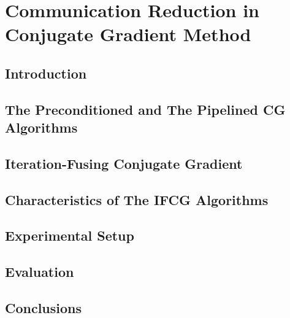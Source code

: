 \chapter{Communication Reduction in Conjugate Gradient Method}
\label{chap:ifcg}

\newcommand{\MAXPERF}{42\%}
\newcommand{\AVERAGEPERF}{13\%}
\newcommand{\MAXLOC}{81\%}
\newcommand{\AVERAGELOC}{28\%}

\section{Introduction}

\section{The Preconditioned and The Pipelined CG Algorithms}
\label{sec:ifcg_existingCG}

\section{Iteration-Fusing Conjugate Gradient}
\label{sec:ifcg_ifcg}

\section{Characteristics of The IFCG Algorithms}
\label{sec:ifcg_characteristics}

\section{Experimental Setup}
\label{sec:ifcg_setup}

\section{Evaluation}
\label{sec:ifcg_results}

\section{Conclusions}
\label{sec:ifcg_conclusions}

